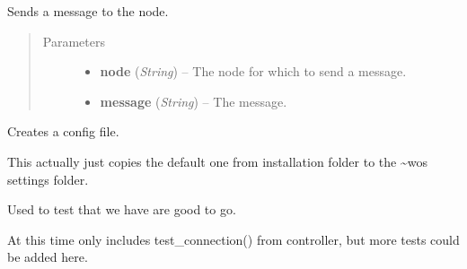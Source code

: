 \documentclass[letterpaper,10pt,english]{sphinxmanual}
\begin{document}
\begin{fulllineitems}
\begin{fulllineitems}
\end{fulllineitems}


\begin{fulllineitems}
\label{state:state.State.swnp_send}
Sends a message to the node.
\begin{quote}\begin{description}
\item[{Parameters}] \leavevmode\begin{itemize}
\item {} 
\textbf{node} (\emph{String}) -- The node for which to send a message.

\item {} 
\textbf{message} (\emph{String}) -- The message.

\end{itemize}

\end{description}\end{quote}

\end{fulllineitems}


\end{fulllineitems}


\begin{fulllineitems}
\label{state:state.create_config}
Creates a config file.

This actually just copies the default one from installation folder
to the \textasciitilde{}wos settings folder.

\end{fulllineitems}


\begin{fulllineitems}
\label{state:state.initialization_test}
Used to test that we have are good to go.

At this time only includes test\_connection() from controller, but
more tests could be added here.

\end{fulllineitems}

\end{document}
